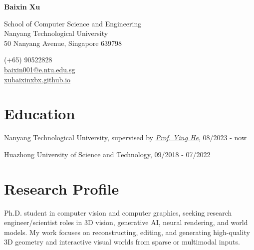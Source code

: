 \documentclass[11pt,letterpaper]{report}
\newcommand{\myname}{Baixin Xu}
\newcommand{\namefont}[1]{{\normalfont\bfseries\Huge{#1}}}
\begin{document}
    \raggedright{}

    \namefont{\myname}

    \vspace{1em}
    \begin{minipage}[t]{0.700\textwidth}
        School of Computer Science and Engineering\\
        Nanyang Technological University \\
        50 Nanyang Avenue, Singapore 639798
        
    \end{minipage}
    \begin{minipage}[t]{0.295\textwidth}
        \flushright{}
        (+65) 90522828\\
        \href{mailto:baixin001@e.ntu.edu.sg}{baixin001@e.ntu.edu.sg} \\
        \href{https://xubaixinxbx.github.io/}{xubaixinxbx.github.io}
    \end{minipage}


    \section*{Education}

    \begin{tablist}

        \item[Ph.D.] \tab{}Nanyang Technological University, supervised by \href{https://personal.ntu.edu.sg/yhe/}{\textit{Prof. Ying He}}, 08/2023 - now
        
        \item[B.E.]  \tab{}Huazhong University of Science and Technology, 09/2018 - 07/2022

    \end{tablist}

    \section*{Research Profile}

    Ph.D. student in computer vision and computer graphics, seeking research engineer/scientist roles in 3D vision, generative AI, neural rendering, and world models. My work focuses on reconstructing, editing, and generating high-quality 3D geometry and interactive visual worlds from sparse or multimodal inputs.
\end{document}
